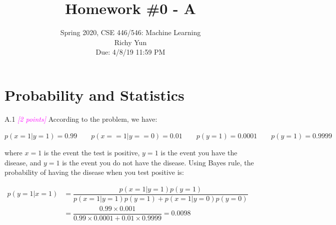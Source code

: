 \documentclass{article}
\date{{}}
\newcommand{\1}{\mathbf{1}}
\newcommand{\points}[1]{\small\textcolor{magenta}{\emph{[#1 points]}} \normalsize}
\begin{document}
\title{Homework \#0 - A}
\author{\normalsize{Spring 2020, CSE 446/546: Machine Learning}\\
\normalsize{Richy Yun} \\
\normalsize{Due: 4/8/19  11:59 PM}}
\maketitle


\section*{Probability and Statistics}
A.1 \points{2} According to the problem, we have:
\begin{center}
$p(x=1|y=1)=0.99 \qquad p(x==1|y==0)=0.01 \qquad p(y=1)=0.0001 \qquad p(y=1)=0.9999$
\end{center}
where $x=1$ is the event the test is positive, $y=1$ is the event you have the disease, and $y=1$ is the event you do not have the disease. Using Bayes rule, the probability of having the disease when you test positive is: 
\begin{center}
	$\begin{aligned}
		p(y=1|x=1)&=\dfrac{p(x=1|y=1)p(y=1)}{p(x=1|y=1)p(y=1)+p(x=1|y=0)p(y=0)}\\
		&=\dfrac{0.99\times0.001}{0.99\times0.0001+0.01\times0.9999}=0.0098
	\end{aligned}$
\end{center}
\end{document}

